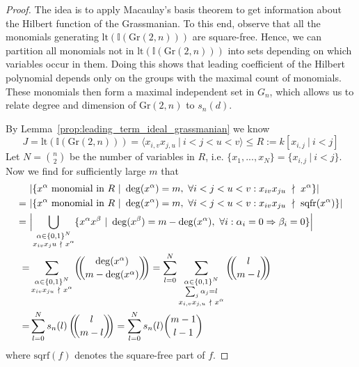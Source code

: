 \documentclass{scrartcl}
\newcommand{\I}{\mathbb{I}}
\newcommand{\Gr}{\mathrm{Gr}}
\theoremstyle{definition}
\begin{document}
\begin{proof}
    The idea is to apply Macaulay's basis theorem to get information about the Hilbert function of the Grassmanian.
    To this end, observe that all the monomials generating $\mathrm{lt}(\I(\Gr(2, n)))$ are square-free.
    Hence, we can partition all monomials not in $\mathrm{lt}(\I(\Gr(2, n)))$ into sets depending on which variables occur in them.
    Doing this shows that leading coefficient of the Hilbert polynomial depends only on the groups with the maximal count of monomials.
    These monomials then form a maximal independent set in $G_n$, which allows us to relate degree and dimension of $\Gr(2, n)$ to $s_n(d)$. 

    By Lemma~\ref{prop:leading_term_ideal_grassmanian} we know
    \begin{equation*}
        J = \mathrm{lt}(\I(\Gr(2, n))) = \langle x_{i, v} x_{j, u} \ | \ i < j < u < v \rangle \leq R := k[x_{i, j} \ | \ i < j]
    \end{equation*}
    Let $N = {n \choose 2}$ be the number of variables in $R$, i.e. $\{x_1, ..., x_N\} = \{ x_{i, j} \ | \ i < j \}$. Now we find for sufficiently large $m$ that
    \begin{align*}
        &|\{ x^\alpha \ \text{monomial in $R$} \ | \ \deg(x^\alpha) = m, \ \forall i < j < u < v: x_{iv} x_{ju} \ \nmid \ x^\alpha \}| \\
        =\ &|\{ x^\alpha \ \text{monomial in $R$} \ | \ \deg(x^\alpha) = m, \ \forall i < j < u < v: x_{iv} x_{ju} \ \nmid \ \mathrm{sqfr}(x^\alpha) \}| \\
        =\ &\Bigl| \bigcup_{\substack{\alpha \in \{0, 1\}^N\\x_{iv} x_ju \ \nmid \ x^\alpha}} \{ x^\alpha x^\beta \ | \ \deg(x^\beta) = m - \deg(x^\alpha), \ \forall i: \alpha_i = 0 \Rightarrow \beta_i = 0 \} \Bigr| \\
        =& \sum_{\substack{\alpha \in \{0, 1\}^N\\x_{iv} x_{ju} \ \nmid \ x^\alpha}} \left(\!\!{\deg(x^\alpha) \choose m - \deg(x^\alpha)}\!\!\right) = \sum_{l = 0}^N \sum_{\substack{\alpha \in \{0, 1\}^N\\\sum_j \alpha_j = l\\x_{i, v} x_{j, u} \ \nmid \ x^\alpha}} \left(\!\!{ l \choose m - l }\!\!\right) \\
        =& \sum_{l = 0}^N s_n(l) \left(\!\!{ l \choose m - l }\!\!\right) = \sum_{l = 0}^N s_n(l) {m - 1 \choose l - 1}
    \end{align*}
    where $\mathrm{sqrf}(f)$ denotes the square-free part of $f$.

\end{proof}
\end{document}
